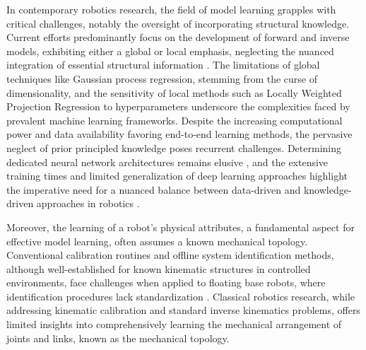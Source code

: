 \documentclass[12pt, a4paper]{article}
\newcommand{\redtext}[1]{\textcolor{red}{#1}}
\begin{document}
%
%

In contemporary robotics research, the field of model learning grapples with critical challenges, notably the oversight of incorporating structural knowledge. Current efforts predominantly focus on the development of forward and inverse models, exhibiting either a global or local emphasis, neglecting the nuanced integration of essential structural information \cite{NguyenTuong2011Modellearningrobot}. The limitations of global techniques like Gaussian process regression, stemming from the curse of dimensionality, and the sensitivity of local methods such as Locally Weighted Projection Regression to hyperparameters underscore the complexities faced by prevalent machine learning frameworks. Despite the increasing computational power and data availability favoring end-to-end learning methods, the pervasive neglect of prior principled knowledge poses recurrent challenges. Determining dedicated neural network architectures remains elusive \cite{Baker2017Designingneuralnetwork,Elsken2019Neuralarchitecturesearch}, and the extensive training times and limited generalization of deep learning approaches highlight the imperative need for a nuanced balance between data-driven and knowledge-driven approaches in robotics \cite{Pierson2017Deeplearningrobotics,Suenderhauf2018limitspotentialsdeep}.

Moreover, the learning of a robot's physical attributes, a fundamental aspect for effective model learning, often assumes a known mechanical topology. Conventional calibration routines and offline system identification methods, although well-established for known kinematic structures in controlled environments, face challenges when applied to floating base robots, where identification procedures lack standardization \cite{Hollerbach1996CalibrationIndexTaxonomy,Swevers2007Dynamicmodelidentification,LeboutetInertialParameterIdentification,Ayusawa2014Identifiabilityidentificationinertial,Lee2022OptimizedSystemIdentification}. Classical robotics research, while addressing kinematic calibration and standard inverse kinematics problems, offers limited insights into comprehensively learning the mechanical arrangement of joints and links, known as the mechanical topology.
\end{document}
